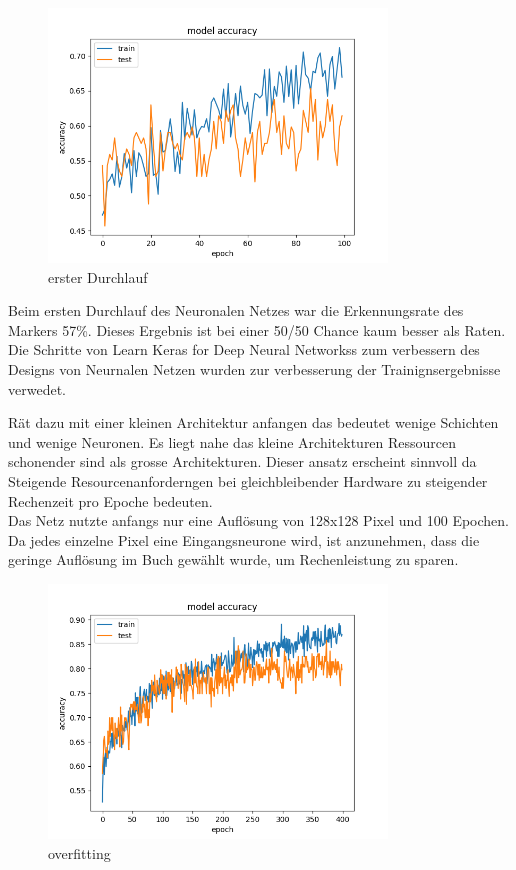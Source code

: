 \documentclass[conference]{IEEEtran}
\begin{document}
\begin{figure}[!h]
	\centering
	\includegraphics[width=9cm]{img/160x120:100@32_accuracy.png}
	\caption{erster Durchlauf}
	\label{Initiales Ergebnis}
\end{figure}
Beim ersten Durchlauf des Neuronalen Netzes war die Erkennungsrate des Markers 57\%. Dieses Ergebnis ist bei einer 50/50 Chance kaum besser als Raten.\\

Die Schritte von  \glqq Learn Keras for Deep Neural Networkss\grqq  \cite{b3} zum verbessern des Designs von Neurnalen Netzen wurden zur verbesserung der Trainignsergebnisse verwedet. 

\cite{b3}  Rät dazu mit einer kleinen Architektur anfangen das bedeutet wenige Schichten und wenige Neuronen. Es liegt nahe das kleine Architekturen Ressourcen schonender sind als grosse Architekturen. Dieser ansatz erscheint sinnvoll da Steigende Resourcenanforderngen bei gleichbleibender Hardware zu steigender Rechenzeit pro Epoche bedeuten. \\

Das Netz nutzte anfangs nur eine Auflösung von 128x128 Pixel und 100 Epochen. Da jedes einzelne Pixel eine Eingangsneurone wird, ist anzunehmen, dass die geringe Auflösung im Buch gewählt wurde, um Rechenleistung zu sparen. \\

\begin{figure}[!h]
	\centering
	\includegraphics[width=9cm]{img/213x160:400@32_accuracy.png}
	\caption{overfitting}
	\label{Overfitt }
\end{figure}
\end{document}
